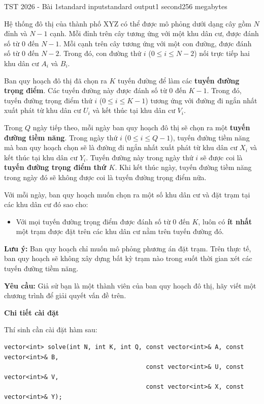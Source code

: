 \begin{problem}{TST 2026 - Bài 1}{standard input}{standard output}{1 second}{256 megabytes}

Hệ thống đô thị của thành phố XYZ có thể được mô phỏng dưới dạng cây gồm $N$ đỉnh và $N-1$ cạnh. Mỗi đỉnh trên cây tương ứng với một khu dân cư, được đánh số từ $0$ đến $N-1$. Mỗi cạnh trên cây tương ứng với một con đường, được đánh số từ $0$ đến $N-2$. Trong đó, con đường thứ $i$ ($0\le i\le N-2$) nối trực tiếp hai khu dân cư $A_i$ và $B_i$.

Ban quy hoạch đô thị đã chọn ra $K$ tuyến đường để làm các \textbf{tuyến đường trọng điểm}. Các tuyến đường này được đánh số từ $0$ đến $K-1$. Trong đó, tuyến đường trọng điểm thứ $i$ ($0\le i\le K-1$) tương ứng với đường đi ngắn nhất xuất phát từ khu dân cư $U_i$ và kết thúc tại khu dân cư $V_i$.

Trong $Q$ ngày tiếp theo, mỗi ngày ban quy hoạch đô thị sẽ chọn ra một \textbf{tuyến đường tiềm năng}. Trong ngày thứ $i$ ($0\le i\le Q-1$), tuyến đường tiềm năng mà ban quy hoạch chọn sẽ là đường đi ngắn nhất xuất phát từ khu dân cư $X_i$ và kết thúc tại khu dân cư $Y_i$. Tuyến đường này trong ngày thứ $i$ sẽ được coi là \textbf{tuyến đường trọng điểm thứ $K$}. Khi kết thúc ngày, tuyến đường tiềm năng trong ngày đó sẽ không được coi là tuyến đường trọng điểm nữa.

Với mỗi ngày, ban quy hoạch muốn chọn ra một số khu dân cư và đặt trạm tại các khu dân cư đó sao cho:
\begin{itemize}
   \item Với mọi tuyến đường trọng điểm được đánh số từ $0$ đến $K$, luôn có \textbf{ít nhất} một trạm được đặt trên các khu dân cư nằm trên tuyến đường đó.
\end{itemize}

\textbf{Lưu ý:} Ban quy hoạch chỉ muốn mô phỏng phương án đặt trạm. Trên thực tế, ban quy hoạch sẽ không xây dựng bất kỳ trạm nào trong suốt thời gian xét các tuyến đường tiềm năng.

\textbf{Yêu cầu:} Giả sử bạn là một thành viên của ban quy hoạch đô thị, hãy viết một chương trình để giải quyết vấn đề trên.

\InputFile
\textbf{Chi tiết cài đặt}

Thí sinh cần cài đặt hàm sau:

\begin{lstlisting}
vector<int> solve(int N, int K, int Q, const vector<int>& A, const vector<int>& B,
                                       const vector<int>& U, const vector<int>& V,
                                       const vector<int>& X, const vector<int>& Y);
\end{lstlisting}


\end{problem}
